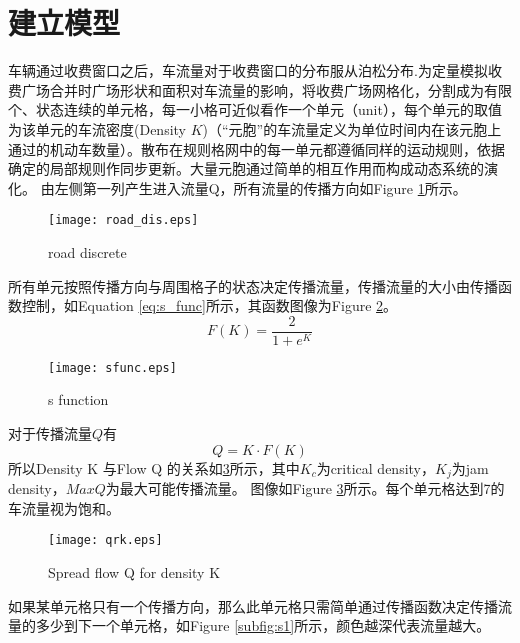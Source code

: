 \documentclass{mcmthesis}
\begin{document}
\section{建立模型}
车辆通过收费窗口之后，车流量对于收费窗口的分布服从泊松分布.为定量模拟收费广场合并时广场形状和面积对车流量的影响，将收费广场网格化，分割成为有限个、状态连续的单元格，每一小格可近似看作一个单元（unit），每个单元的取值为该单元的车流密度(Density $K$)（“元胞”的车流量定义为单位时间内在该元胞上通过的机动车数量）。散布在规则格网中的每一单元都遵循同样的运动规则，依据确定的局部规则作同步更新。大量元胞通过简单的相互作用而构成动态系统的演化。
由左侧第一列产生进入流量Q，所有流量的传播方向如Figure \ref{fig:road_dis}所示。
\begin{figure}[h]
\small
\centering
\texttt{[image: road\_dis.eps]}
\caption{\label{fig:road_dis}road discrete} 
\end{figure}
所有单元按照传播方向与周围格子的状态决定传播流量，传播流量的大小由传播函数控制，如Equation \ref{eq:s_func}所示，其函数图像为Figure \ref{fig:s_func}。
\begin{equation}
F(K)=\frac{2}{1+e^{K}}
\label{eq:s_func}
\end{equation}
\begin{figure}[!htbp]
	\small
	\centering
	\texttt{[image: sfunc.eps]}
	\caption{\label{fig:s_func}s function} 
\end{figure}
对于传播流量$Q$有
$$Q=K \cdot F(K)$$
所以Density K 与Flow Q 的关系如\ref{fig:qrk}所示，其中$K_c$为critical density，$K_j$为jam density，$MaxQ$为最大可能传播流量。
图像如Figure \ref{fig:qrk}所示。每个单元格达到7的车流量视为饱和。
\begin{figure}[!htbp]
	\small
	\centering
	\texttt{[image: qrk.eps]}
	\caption{\label{fig:qrk}Spread flow Q for density K} 
\end{figure}
如果某单元格只有一个传播方向，那么此单元格只需简单通过传播函数决定传播流量的多少到下一个单元格，如Figure \ref{subfig:s1}所示，颜色越深代表流量越大。
\end{document}
